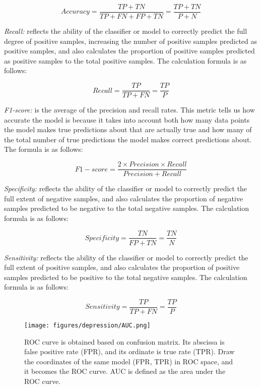 \begin{equation}
Accuracy =\frac{TP+TN}{TP+FN+FP+TN}=\frac{TP+TN}{P+N}
\end{equation}


\emph{Recall:} reflects the ability of the classifier or model to correctly predict the full degree of positive samples, increasing the number of positive samples predicted as positive samples, and also calculates the proportion of positive samples predicted as positive samples to the total positive samples. The calculation formula is as follows:

\begin{equation}
Recall =\frac{TP}{TP+FN}=\frac{TP}{P}
\end{equation}


\emph{F1-score:} is the average of the precision and recall rates. This metric tells us how accurate the model is because it takes into account both how many data points the model makes true predictions about that are actually true and how many of the total number of true predictions the model makes correct predictions about. The formula is as follows:

\begin{equation}
F1-score=\frac{2 \times  Precision  \times   Recall }{ Precision + Recall }
\end{equation}


\emph{Specificity:} reflects the ability of the classifier or model to correctly predict the full extent of negative samples, and also calculates the proportion of negative samples predicted to be negative to the total negative samples. The calculation formula is as follows:

\begin{equation}
Specificity =\frac{TN}{FP+TN}=\frac{TN}{N}
\end{equation}


\emph{Sensitivity:} reflects the ability of the classifier or model to correctly predict the full extent of positive samples, and also calculates the proportion of positive samples predicted to be positive to the total negative samples. The calculation formula is as follows:

\begin{equation}
 Sensitivity =\frac{TP}{TP+FN}=\frac{TP}{P}
\end{equation}


\begin{figure}[tbp]
	\centering	
	\label{fig_hard_case1}\texttt{[image: figures/depression/AUC.png]}		
	\caption{
	ROC curve is obtained based on confusion matrix. Its abscissa is false positive rate (FPR), and its ordinate is true rate (TPR). Draw the coordinates of the same model (FPR, TPR) in ROC space, and it becomes the ROC curve. 
	AUC is defined as the area under the ROC curve. 
	}
	\label{AUC}
\end{figure}


